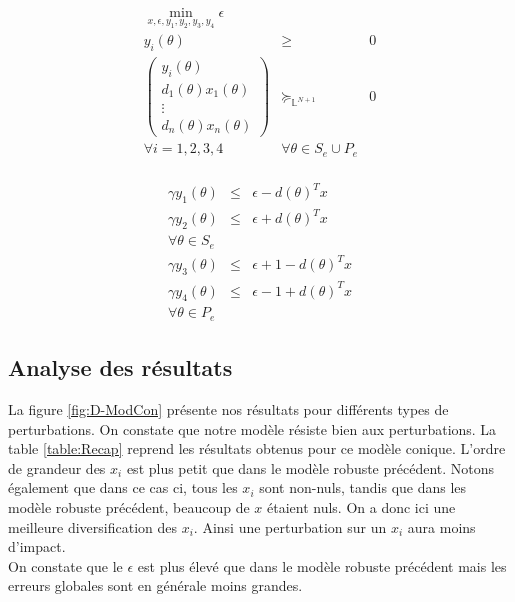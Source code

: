 \begin{center}
\begin{minipage}{0.4\textwidth}
\begin{eqnarray*}
\min_{x,\epsilon ,y_1,y_2,y_3,y_4} \epsilon & & \\
y_{i}(\theta) & \geq & 0 \\
\begin{pmatrix}
y_i(\theta) \\
d_1(\theta)x_1(\theta)\\
\vdots \\
d_n(\theta)x_n(\theta)
\end{pmatrix}
& \succeq_{\mathbb{L}^{N+1}}& 0\\
\forall i = 1,2,3,4 &
\forall \theta \in S_e \cup P_e & \\
\end{eqnarray*}
\end{minipage}
\vline
\begin{minipage}{0.4\textwidth}
\begin{eqnarray*}
\gamma y_{1}(\theta) & \leq & \epsilon -d(\theta)^Tx \\
\gamma y_{2}(\theta) & \leq & \epsilon + d(\theta)^Tx \\
\forall \theta \in S_e & & \\
\gamma y_{3}(\theta) & \leq & \epsilon +1 -d(\theta)^Tx \\
\gamma y_{4}(\theta) & \leq & \epsilon -1 + d(\theta)^Tx \\
\forall \theta \in P_e & &
\end{eqnarray*}
\end{minipage}
\end{center}

\subsection{Analyse des résultats}
La figure \ref{fig:D-ModCon} présente nos résultats pour différents types de perturbations. On constate que notre modèle résiste bien aux perturbations. La table \ref{table:Recap} reprend les résultats obtenus pour ce modèle conique. L'ordre de grandeur des $x_i$ est plus petit que dans le modèle robuste précédent. Notons également que dans ce cas ci, tous les $x_i$ sont non-nuls, tandis que dans les modèle robuste précédent, beaucoup de $x$ étaient nuls. On a donc ici une meilleure diversification des $x_i$. Ainsi une perturbation sur un $x_i$ aura moins d'impact. \\
On constate que le $\epsilon$ est plus élevé que dans le modèle robuste précédent mais les erreurs globales sont en générale moins grandes. 

